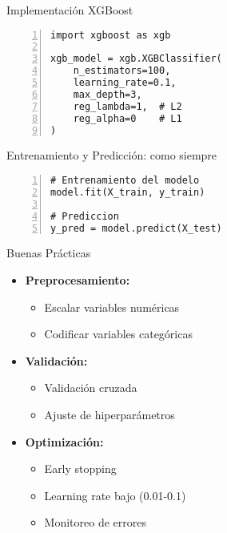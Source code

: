 \documentclass{beamer}
\begin{document}
\begin{frame}[fragile]{Implementación XGBoost}
    \begin{lstlisting}[numbers=left, numbersep=5pt]
import xgboost as xgb

xgb_model = xgb.XGBClassifier(
    n_estimators=100,
    learning_rate=0.1,
    max_depth=3,
    reg_lambda=1,  # L2
    reg_alpha=0    # L1
)
    \end{lstlisting}
\end{frame}

\begin{frame}[fragile]{Entrenamiento y Predicción: como siempre}
    \begin{lstlisting}[numbers=left, numbersep=5pt]
# Entrenamiento del modelo
model.fit(X_train, y_train)

# Prediccion
y_pred = model.predict(X_test)
    \end{lstlisting}
\end{frame}

\begin{frame}{Buenas Prácticas}
    \begin{itemize}
        \item<1-> \textbf{Preprocesamiento:}
        \begin{itemize}
            \item Escalar variables numéricas
            \item Codificar variables categóricas
        \end{itemize}
        \item<2-> \textbf{Validación:}
        \begin{itemize}
            \item Validación cruzada
            \item Ajuste de hiperparámetros
        \end{itemize}
        \item<3-> \textbf{Optimización:}
        \begin{itemize}
            \item Early stopping
            \item Learning rate bajo (0.01-0.1)
            \item Monitoreo de errores
        \end{itemize}
    \end{itemize}
\end{frame}
\end{document}
